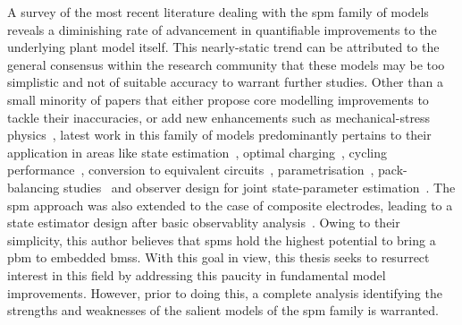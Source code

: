 A survey  of the  most recent  literature dealing with  the \gls{spm}  family of
models reveals a diminishing rate of advancement in quantifiable improvements to
the underlying plant model itself. This nearly-static trend can be attributed to
the general  consensus within the  research community  that these models  may be
too  simplistic  and  not  of  suitable accuracy  to  warrant  further  studies.
Other  than a  small  minority  of papers  that  either  propose core  modelling
improvements  to tackle  their inaccuracies,  or  add new  enhancements such  as
mechanical-stress  physics~\cite{Li2017a,Li2018b}, latest  work  in this  family
of  models predominantly  pertains  to  their application  in  areas like  state
estimation~\cite{Chaochun2018,Lin2017,Tran2017,Moura2017,Zou2016a},      optimal
charging~\cite{Perez2017,Perez2017a},    cycling    performance~\cite{Maia2017},
conversion           to            equivalent           circuits~\cite{Li2017b},
parametrisation~\cite{Li2018,Rajabloo2017,Bizeray2017,Namor2017}, pack-balancing
studies~\cite{Docimo2018a}  and   observer  design  for   joint  state-parameter
estimation~\cite{Ascencio2016}. The \gls{spm} approach  was also extended to the
case of  composite electrodes, leading to  a state estimator design  after basic
observablity  analysis~\cite{Bartlett2015}.  Owing  to  their  simplicity,  this
author believes that \glspl{spm} hold the highest potential to bring a \gls{pbm}
to embedded \glspl{bms}. With this goal  in view, this thesis seeks to resurrect
interest  in  this  field  by  addressing  this  paucity  in  fundamental  model
improvements. However, prior to doing  this, a complete analysis identifying the
strengths  and weaknesses  of  the salient  models of  the  \gls{spm} family  is
warranted.


